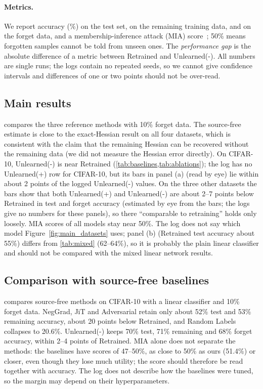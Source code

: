\documentclass[10pt,twocolumn,letterpaper]{article}
\begin{document}
\paragraph{Metrics.}
We report accuracy (\%) on the test set, on the remaining training data, and on the forget data, and a membership-inference attack (MIA) score~\cite{shokri2017membership}; 50\% means forgotten samples cannot be told from unseen ones.
The \emph{performance gap} is the absolute difference of a metric between Retrained and Unlearned(-).
All numbers are single runs; the logs contain no repeated seeds, so we cannot give confidence intervals and differences of one or two points should not be over-read.



\subsection{Main results}
\label{sec:main}
 compares the three reference methods with 10\% forget data.
The source-free estimate is close to the exact-Hessian result on all four datasets, which is consistent with the claim that the remaining Hessian can be recovered without the remaining data (we did not measure the Hessian error directly).
On CIFAR-10, Unlearned(-) is near Retrained (\cref{tab:baselines,tab:ablations}); the log has no Unlearned(+) row for CIFAR-10, but its bars in panel (a) (read by eye) lie within about 2 points of the logged Unlearned(-) values.
On the three other datasets the bars show that both Unlearned(+) and Unlearned(-) are about 2--7 points below Retrained in test and forget accuracy (estimated by eye from the bars; the logs give no numbers for these panels), so there ``comparable to retraining'' holds only loosely.
MIA scores of all models stay near 50\%.
The log does not say which model Figure~\ref{fig:main_datasets} uses; panel (b) (Retrained test accuracy about 55\%) differs from \cref{tab:mixed} (62--64\%), so it is probably the plain linear classifier and should not be compared with the mixed linear network results.



\subsection{Comparison with source-free baselines}
\label{sec:comp}
 compares source-free methods on CIFAR-10 with a linear classifier and 10\% forget data.
NegGrad, JiT and Adversarial retain only about 52\% test and 53\% remaining accuracy, about 20 points below Retrained, and Random Labels collapses to 20.6\%.
Unlearned(-) keeps 70\% test, 71\% remaining and 68\% forget accuracy, within 2--4 points of Retrained.
MIA alone does not separate the methods: the baselines have scores of 47--50\%, as close to 50\% as ours (51.4\%) or closer, even though they lose much utility; the score should therefore be read together with accuracy.
The log does not describe how the baselines were tuned, so the margin may depend on their hyperparameters.
\end{document}

